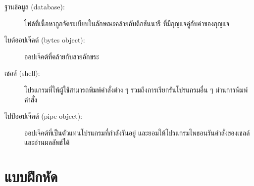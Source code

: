 \begin{description}

\item[ฐานข้อมูล (database):] 
ไฟล์ที่เนื้อหาถูกจัดระเบียบในลักษณะคล้ายกับดิกชันนารี ที่มีกุญแจคู่กับค่าของกุญแจ


\item[ไบต์ออปเจ๊คต์ (bytes object):] 
ออปเจ๊คต์ที่คล้ายกับสายอักขระ



\item[เชลล์ (shell):] 
โปรแกรมที่ให้ผู้ใช้สามารถพิมพ์คำสั่งต่าง ๆ รวมถึงการเรียกรันโปรแกรมอื่น ๆ ผ่านการพิมพ์คำสั่ง



\item[ไปป์ออปเจ๊คต์ (pipe object):] 
ออปเจ๊คต์ที่เป็นตัวแทนโปรแกรมที่กำลังรันอยู่
และยอมให้โปรแกรมไพธอนรันคำสั่งของเชลล์และอ่านผลลัพธ์ได้

\end{description}

\section{แบบฝึกหัด}

